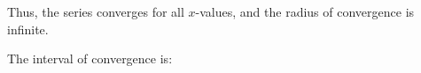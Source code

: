 \documentclass{ximera}
\begin{document}
\begin{exercise}
\begin{hint}
\begin{question}
\begin{question}
\begin{question}
Thus, the series converges for all $x$-values, and the radius of convergence is infinite.
 
 \end{question}
 \end{question}
 \end{question}
\end{hint}

\begin{exercise}
The interval of convergence is:
\begin{multipleChoice}
\choice[correct]{$(-\infty,\infty)$}
\end{multipleChoice}

\end{exercise}
\end{exercise}
\end{document}
